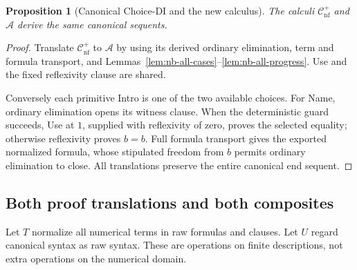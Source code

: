 \documentclass[11pt,a4paper]{article}
\newtheorem{proposition}[theorem]{Proposition}
\theoremstyle{definition}\newtheorem{definition}[theorem]{Definition}
\theoremstyle{remark}\newtheorem{remark}[theorem]{Remark}
\begin{document}
\begin{proposition}[Canonical Choice-DI and the new calculus]
\label{prop:nb-canonical-choice}
The calculi $\mathcal C_{\mathrm{nf}}^+$ and $\mathcal A$ derive the
same canonical sequents.
\end{proposition}
\begin{proof}
Translate $\mathcal C_{\mathrm{nf}}^+$ to $\mathcal A$ by using its
derived ordinary elimination, term and formula transport, and
Lemmas~\ref{lem:nb-all-cases}--\ref{lem:nb-all-progress}. Use and the
fixed reflexivity clause are shared.

Conversely each primitive Intro is one of the two available choices.
For Name, ordinary elimination opens its witness clause. When the
deterministic guard succeeds, Use at $1$, supplied with reflexivity
of zero, proves the selected equality; otherwise reflexivity proves
$b=b$. Full formula transport gives the exported normalized formula,
whose stipulated freedom from $b$ permits ordinary elimination to
close. All translations preserve the entire canonical end sequent.
\end{proof}

\subsection{Both proof translations and both composites}

Let $T$ normalize all numerical terms in raw formulas and clauses.
Let $U$ regard canonical syntax as raw syntax. These are operations on
finite descriptions, not extra operations on the numerical domain.
\end{document}
